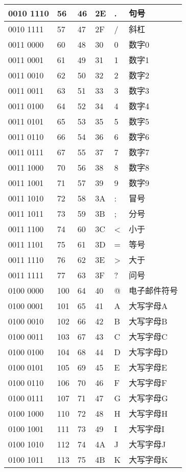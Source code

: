 \begin{longtable}{| p{.10\linewidth} | p{.08\linewidth} | p{.08\linewidth} | p{.10\linewidth} | p{.28\linewidth} | p{.15\linewidth} |}
0010 1110 & 56 & 46 & 2E & . & 句号 \\ \hline
0010 1111 & 57 & 47 & 2F & / & 斜杠 \\ \hline
0011 0000 & 60 & 48 & 30 & 0 & 数字0 \\ \hline
0011 0001 & 61 & 49 & 31 & 1 & 数字1 \\ \hline
0011 0010 & 62 & 50 & 32 & 2 & 数字2 \\ \hline
0011 0011 & 63 & 51 & 33 & 3 & 数字3 \\ \hline
0011 0100 & 64 & 52 & 34 & 4 & 数字4 \\ \hline
0011 0101 & 65 & 53 & 35 & 5 & 数字5 \\ \hline
0011 0110 & 66 & 54 & 36 & 6 & 数字6 \\ \hline
0011 0111 & 67 & 55 & 37 & 7 & 数字7 \\ \hline
0011 1000 & 70 & 56 & 38 & 8 & 数字8 \\ \hline
0011 1001 & 71 & 57 & 39 & 9 & 数字9 \\ \hline
0011 1010 & 72 & 58 & 3A & : & 冒号 \\ \hline
0011 1011 & 73 & 59 & 3B & ; & 分号 \\ \hline
0011 1100 & 74 & 60 & 3C & < & 小于 \\ \hline
0011 1101 & 75 & 61 & 3D & = & 等号 \\ \hline
0011 1110 & 76 & 62 & 3E & > & 大于 \\ \hline
0011 1111 & 77 & 63 & 3F & ? & 问号 \\ \hline
0100 0000 & 100 & 64 & 40 & @ & 电子邮件符号 \\ \hline
0100 0001 & 101 & 65 & 41 & A & 大写字母A \\ \hline
0100 0010 & 102 & 66 & 42 & B & 大写字母B \\ \hline
0100 0011 & 103 & 67 & 43 & C & 大写字母C \\ \hline
0100 0100 & 104 & 68 & 44 & D & 大写字母D \\ \hline
0100 0101 & 105 & 69 & 45 & E & 大写字母E \\ \hline
0100 0110 & 106 & 70 & 46 & F & 大写字母F \\ \hline
0100 0111 & 107 & 71 & 47 & G & 大写字母G \\ \hline
0100 1000 & 110 & 72 & 48 & H & 大写字母H \\ \hline
0100 1001 & 111 & 73 & 49 & I & 大写字母I \\ \hline
0100 1010 & 112 & 74 & 4A & J & 大写字母J \\ \hline
0100 1011 & 113 & 75 & 4B & K & 大写字母K \\ \hline

\end{longtable}
